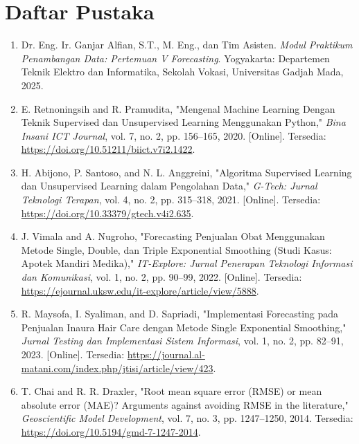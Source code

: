 \chapter{Daftar Pustaka}
\begin{enumerate}
    \item \label{modulPraktikum} Dr. Eng. Ir. Ganjar Alfian, S.T., M. Eng., dan Tim Asisten. \textit{Modul Praktikum Penambangan Data: Pertemuan V Forecasting}. Yogyakarta: Departemen Teknik Elektro dan Informatika, Sekolah Vokasi, Universitas Gadjah Mada, 2025.
    
    \item \label{retnoningsih} E. Retnoningsih and R. Pramudita, "Mengenal Machine Learning Dengan Teknik Supervised dan Unsupervised Learning Menggunakan Python," \textit{Bina Insani ICT Journal}, vol. 7, no. 2, pp. 156--165, 2020. [Online]. Tersedia: \url{https://doi.org/10.51211/biict.v7i2.1422}.
    
    \item \label{santoso} H. Abijono, P. Santoso, and N. L. Anggreini, "Algoritma Supervised Learning dan Unsupervised Learning dalam Pengolahan Data," \textit{G-Tech: Jurnal Teknologi Terapan}, vol. 4, no. 2, pp. 315--318, 2021. [Online]. Tersedia: \url{https://doi.org/10.33379/gtech.v4i2.635}.
    
    \item \label{vimala} J. Vimala and A. Nugroho, "Forecasting Penjualan Obat Menggunakan Metode Single, Double, dan Triple Exponential Smoothing (Studi Kasus: Apotek Mandiri Medika)," \textit{IT-Explore: Jurnal Penerapan Teknologi Informasi dan Komunikasi}, vol. 1, no. 2, pp. 90--99, 2022. [Online]. Tersedia: \url{https://ejournal.uksw.edu/it-explore/article/view/5888}.
    
    \item \label{maysofa} R. Maysofa, I. Syaliman, and D. Sapriadi, "Implementasi Forecasting pada Penjualan Inaura Hair Care dengan Metode Single Exponential Smoothing," \textit{Jurnal Testing dan Implementasi Sistem Informasi}, vol. 1, no. 2, pp. 82--91, 2023. [Online]. Tersedia: \url{https://journal.al-matani.com/index.php/jtisi/article/view/423}.
    
    \item \label{chai} T. Chai and R. R. Draxler, "Root mean square error (RMSE) or mean absolute error (MAE)? Arguments against avoiding RMSE in the literature," \textit{Geoscientific Model Development}, vol. 7, no. 3, pp. 1247--1250, 2014. Tersedia: \url{https://doi.org/10.5194/gmd-7-1247-2014}.
    

\end{enumerate}
